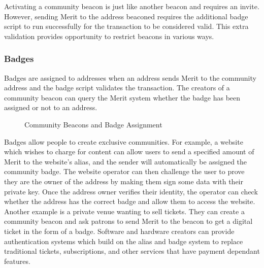 \documentclass{article}
\begin{document}
Activating a community beacon is just like another beacon and requires an invite.
However, sending Merit to the address beaconed requires the additional badge script to
run successfully for the transaction to be considered valid.  This extra validation
provides opportunity to restrict beacons in various ways.

\subsubsection{Badges}

Badges are assigned to addresses when an address sends Merit to the community address
and the badge script validates the transaction.  The creators of a community beacon
can query the Merit system whether the badge has been assigned or not to an address.

\begin{figure}[H]
    \begin{center}
    \end{center}
    \caption{Community Beacons and Badge Assignment}
\end{figure}

Badges allow people to create exclusive communities.  For example, a website
which wishes to charge for content can allow users to send a specified amount
of Merit to the website's alias, and the sender will automatically be assigned the
community badge.  The website operator can then challenge the user to prove they
are the owner of the address by making them sign some data with their private
key.  Once the address owner verifies their identity, the operator can check 
whether the address has the correct badge and allow them to access the website.
Another example is a private venue wanting to sell tickets.  They can create a 
community beacon and ask patrons to send Merit to the beacon to get a digital
ticket in the form of a badge.  Software and hardware creators can provide
authentication systems which build on the alias and badge system to replace
traditional tickets, subscriptions, and other services that have payment dependant
features.
\end{document}
